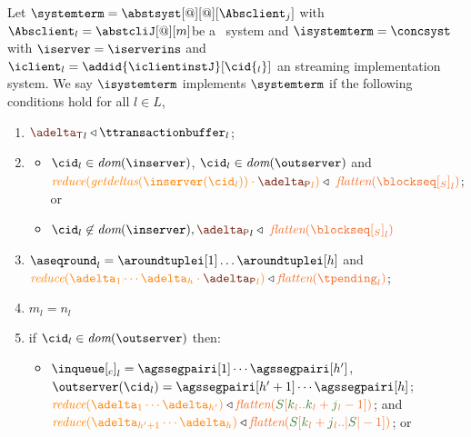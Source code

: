 \begin{definition} \label{def:implementation}
Let  $\systemterm = \abstsyst[@][@][\Absclient_j]$ with $\Absclient_l={\abstcliJ[@][m]}$be a \tgspcalculus\ system and 
$\isystemterm = \concsyst $  with $\iserver = \iserverins$ and $\iclient_l = \addid{\iclientinstJ}[{\cid{_l}}]$ 
an streaming implementation
system. We say $\isystemterm$ implements $\systemterm$ if the following conditions hold for all $l \in L$,

\begin{enumerate}
	\item \label{prop_transactions} ${\transactionbuffer}_l\triangleleft{\ttransactionbuffer}_l$;
	\item \label{prop_sent}  
	\begin{itemize}
	   \item   $\cid_l \in \dom\inserver$, $\cid_l \in \dom\outserver$ and
	 $ \ireduce{\igetdeltas{\inserver(\cid_l)}\cdot {\pushbuffer}_l} \triangleleft \ \flatten{{\tsent}_l}$; or
	   \item  $\cid_l \not\in\dom\inserver,  {\pushbuffer}_l \triangleleft \ \flatten{{\tsent}_l}$
	\end{itemize}

	\item \label{prop_pending} $\pending_l = \aroundtuplei[1]\ldots\aroundtuplei[h]$ and 
		$\ireduce{\adelta_1\cdots\adelta_h\cdot {\pushbuffer}_l} \triangleleft \flatten{\tpending_l}$;
	\item  \label{prop_size_buffersent} $m_l = n_l$ 
	
\item \label{prop_inclient} if $\cid_l \in \dom{\outserver}$ then:
    \begin{itemize}
      \item ${\inclient}_l = \agssegpairi[1] \cdots \agssegpairi[h']$, $\outserver(\cid_l) = \agssegpairi[h'+1] \cdots \agssegpairi[h]$; 
     \linebreak
      $\ireduce{\adelta_1\cdots\adelta_{h'}}\triangleleft \flatten{ \queuemessage[\tknown_l..\tknown_l+\treceivebuffer_l-1]}$; and $\ireduce{\adelta_{h'+1}\cdots\adelta_h}\triangleleft 
       \flatten{\queuemessage[\tknown_l+\treceivebuffer_l..|\queuemessage| - 1]}$; or
     

\end{itemize}
\end{enumerate}
\end{definition}
